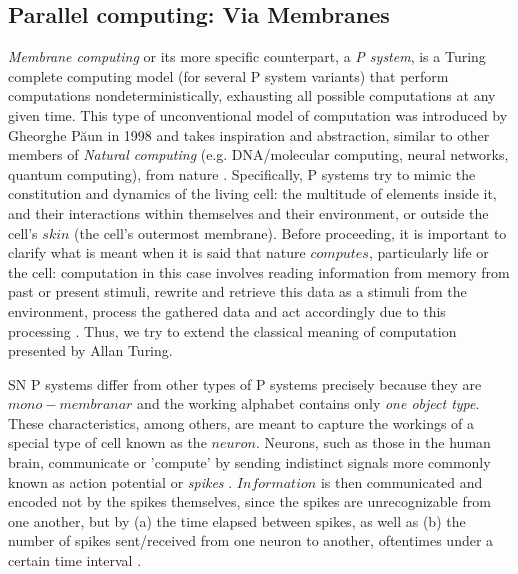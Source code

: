 \documentclass{svmultm}
\begin{document}
\subsection{Parallel computing: Via Membranes}
\textit{Membrane computing} or its more specific counterpart, a \textit{P system}, is a Turing complete computing model (for several P system variants) that perform computations nondeterministically, exhausting all possible  computations at any given time. This type of unconventional model of computation was introduced by Gheorghe P\u aun in 1998 and takes inspiration and abstraction, similar to other members of {\it Natural computing} (e.g. DNA/molecular computing, neural networks, quantum computing), from nature \cite{introtomem}\cite{ppage}. Specifically, P systems try to mimic the constitution and dynamics of the living cell: the multitude of elements inside it, and their interactions within themselves and their environment, or outside the cell's $skin$ (the cell's outermost membrane). Before proceeding, it is important to clarify what is meant when it is said that nature $computes$, particularly life or the cell: computation in this case involves reading information from memory from past or present stimuli, rewrite and retrieve this data as a stimuli from the environment, process the gathered data and act accordingly due to this processing \cite{molecular}. Thus, we try to extend the classical meaning of computation presented by Allan Turing.


SN P systems differ from other types of P systems precisely because they are $mono-membranar$ and the working alphabet contains only \textit{one object type}. These characteristics, among others, are meant to capture the workings of a special type of cell known as the $neuron$. Neurons, such as those in the human brain, communicate or 'compute' by sending indistinct signals more commonly known as action potential or \textit{spikes} \cite{snp}. $Information$ is then communicated and encoded not by the spikes themselves, since the spikes are unrecognizable from one another, but by (a) the time elapsed between spikes, as well as (b) the number of spikes sent/received from one neuron to another, oftentimes under a certain time interval \cite{snp}.
\end{document}
